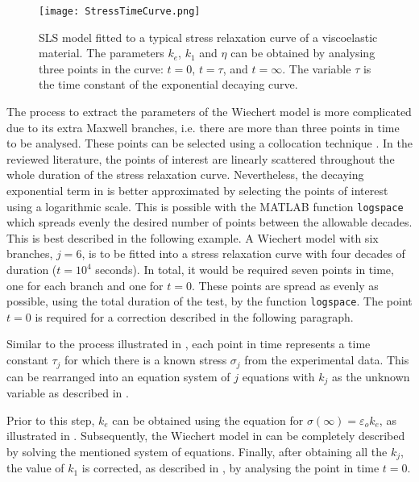 \begin{figure}[htb!]
	\centering
    \texttt{[image: StressTimeCurve.png]}
    \caption{SLS model fitted to a typical stress relaxation curve of a viscoelastic material. The parameters $k_e$, $k_1$ and $\eta$ can be obtained by analysing three points in the curve: $t=0$, $t=\tau$, and $t=\infty$. The variable $\tau$ is the time constant of the exponential decaying curve.}
    \label{fig:stressTimeCurve}
\end{figure}

The process to extract the parameters of the Wiechert model is more complicated due to its extra Maxwell branches, i.e. there are more than three points in time to be analysed. These points can be selected using a collocation technique \cite{roylance2001engineering,machiraju2006viscoelastic}. In the reviewed literature, the points of interest are linearly scattered throughout the whole duration of the stress relaxation curve. Nevertheless, the decaying exponential term in  is better approximated by selecting the points of interest using a logarithmic scale. This is possible with the MATLAB function \texttt{logspace} which spreads evenly the desired number of points between the allowable decades. 
This is best described in the following example. A Wiechert model with six branches, $j=6$, is to be fitted into a stress relaxation curve with four decades of duration ($t=10^4$ seconds). In total, it would be required seven points in time, one for each branch and one for $t=0$. These points are spread as evenly as possible, using the total duration of the test, by the function \texttt{logspace}. The point $t=0$ is required for a correction described in the following paragraph. 

Similar to the process illustrated in , each point in time represents a time constant $\tau_j$ for which there is a known stress $\sigma_j$ from the experimental data. This can be rearranged into an equation system of $j$ equations with $k_j$ as the unknown variable as described in \cite{machiraju2006viscoelastic}. 


Prior to this step, $k_e$ can be obtained using the equation for $\sigma(\infty)=\varepsilon_o k_e$, as illustrated in . Subsequently, the Wiechert model in  can be completely described by solving the mentioned system of equations. Finally, after obtaining all the $k_j$, the value of $k_1$ is corrected, as described in \cite{roylance2001engineering}, by analysing the point in time $t=0$.


